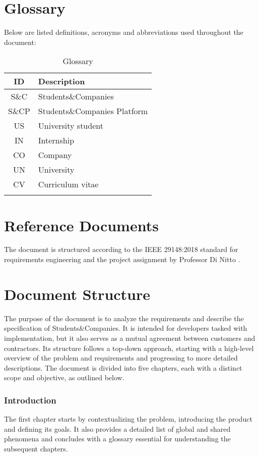 \section{Glossary}
Below are listed definitions, acronyms and abbreviations used throughout the document:

\renewcommand{\arraystretch}{1.5}
\begin{longtable}{|c|p{10.5cm}|}
    \hline \rowcolor{polimiblue!40}
    \textbf{ID} & \textbf{Description} \\ \hline
    S\&C & Students\&Companies \\ \hline
    S\&CP & Students\&Companies Platform \\ \hline
    US & University student \\ \hline
    IN & Internship \\ \hline
    CO & Company \\ \hline
    UN & University \\ \hline
    CV & Curriculum vitae \\ \hline
\caption{Glossary}
\end{longtable}

\section{Reference Documents}
The document is structured according to the IEEE 29148:2018 standard for requirements engineering \cite{ieee2018} and the project assignment by Professor Di Nitto \cite{project2024}.

\section{Document Structure}
The purpose of the document is to analyze the requirements and describe the specification of Students\&Companies.
It is intended for developers tasked with implementation, but it also serves as a mutual agreement between customers and contractors.
Its structure follows a top-down approach, starting with a high-level overview of the problem and requirements and progressing to more detailed descriptions.
The document is divided into five chapters, each with a distinct scope and objective, as outlined below.

\subsubsection{Introduction}
The first chapter starts by contextualizing the problem, introducing the product and defining its goals.
It also provides a detailed list of global and shared phenomena and concludes with a glossary essential for understanding the subsequent chapters.

